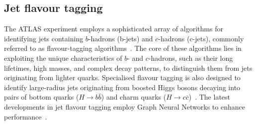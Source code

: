     \subsection{Jet flavour tagging}
        The ATLAS experiment employs a sophisticated array of algorithms for identifying jets containing \(b\)-hadrons (b-jets) and \(c\)-hadrons (c-jets), 
        commonly referred to as flavour-tagging algorithms~\cite{FTAG-2019-07,ATL-PHYS-PUB-2022-027}. The core of these algorithms lies in exploiting the unique characteristics of \(b\)- and \(c\)-hadrons, 
        such as their long lifetimes, high masses, and complex decay patterns, to distinguish them from jets originating from lighter quarks. Specialised 
        flavour tagging is also designed to identify large-radius jets originating from boosted Higgs bosons decaying into pairs of bottom quarks (\(H \to b\bar{b}\)) 
        and charm quarks (\(H \to c\bar{c}\))~\cite{ATL-PHYS-PUB-2020-019,ATL-PHYS-PUB-2023-021}. The latest developments in jet flavour tagging employ Graph Neural Networks
        to enhance performance~\cite{ATL-PHYS-PUB-2022-027, ATL-PHYS-PUB-2023-021}.

